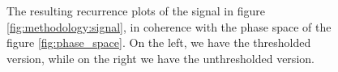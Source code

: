 \begin{figure}[h!]
	\centering
	\caption{The resulting recurrence plots of the signal in figure \ref{fig:methodology:signal}, in coherence with the phase space of the figure \ref{fig:phase_space}. On the left, we have the thresholded version, while on the right we have the unthresholded version.}
	\label{fig:method:rp}
\end{figure}
